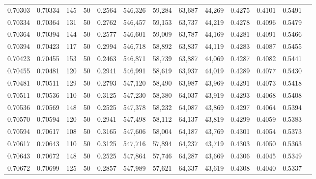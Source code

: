 \begin{tabular}{rrrrrrrrrrrrr}
0.70303 & 0.70334 &   145 &  50 &                                     0.2564 & 546,326 &  59,284 &  63,687 &  44,269 & 0.4275 & 0.4101 & 0.5491 \\
0.70334 & 0.70364 &   131 &  50 &                                     0.2762 & 546,457 &  59,153 &  63,737 &  44,219 & 0.4278 & 0.4096 & 0.5479 \\
0.70364 & 0.70394 &   144 &  50 &                                     0.2577 & 546,601 &  59,009 &  63,787 &  44,169 & 0.4281 & 0.4091 & 0.5466 \\
0.70394 & 0.70423 &   117 &  50 &                                     0.2994 & 546,718 &  58,892 &  63,837 &  44,119 & 0.4283 & 0.4087 & 0.5455 \\
0.70423 & 0.70455 &   153 &  50 &                                     0.2463 & 546,871 &  58,739 &  63,887 &  44,069 & 0.4287 & 0.4082 & 0.5441 \\
0.70455 & 0.70481 &   120 &  50 &                                     0.2941 & 546,991 &  58,619 &  63,937 &  44,019 & 0.4289 & 0.4077 & 0.5430 \\
0.70481 & 0.70511 &   129 &  50 &                                     0.2793 & 547,120 &  58,490 &  63,987 &  43,969 & 0.4291 & 0.4073 & 0.5418 \\
0.70511 & 0.70536 &   110 &  50 &                                     0.3125 & 547,230 &  58,380 &  64,037 &  43,919 & 0.4293 & 0.4068 & 0.5408 \\
0.70536 & 0.70569 &   148 &  50 &                                     0.2525 & 547,378 &  58,232 &  64,087 &  43,869 & 0.4297 & 0.4064 & 0.5394 \\
0.70570 & 0.70594 &   120 &  50 &                                     0.2941 & 547,498 &  58,112 &  64,137 &  43,819 & 0.4299 & 0.4059 & 0.5383 \\
0.70594 & 0.70617 &   108 &  50 &                                     0.3165 & 547,606 &  58,004 &  64,187 &  43,769 & 0.4301 & 0.4054 & 0.5373 \\
0.70617 & 0.70643 &   110 &  50 &                                     0.3125 & 547,716 &  57,894 &  64,237 &  43,719 & 0.4303 & 0.4050 & 0.5363 \\
0.70643 & 0.70672 &   148 &  50 &                                     0.2525 & 547,864 &  57,746 &  64,287 &  43,669 & 0.4306 & 0.4045 & 0.5349 \\
0.70672 & 0.70699 &   125 &  50 &                                     0.2857 & 547,989 &  57,621 &  64,337 &  43,619 & 0.4308 & 0.4040 & 0.5337 \\

\end{tabular}
